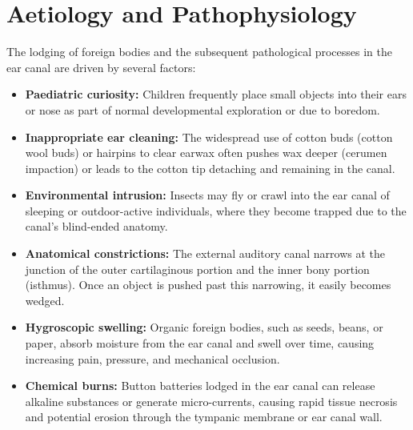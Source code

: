 \section*{Aetiology and Pathophysiology}
The lodging of foreign bodies and the subsequent pathological processes in the ear canal are driven by several factors:
\begin{itemize}
    \item \textbf{Paediatric curiosity:} Children frequently place small objects into their ears or nose as part of normal developmental exploration or due to boredom.
    \item \textbf{Inappropriate ear cleaning:} The widespread use of cotton buds (cotton wool buds) or hairpins to clear earwax often pushes wax deeper (cerumen impaction) or leads to the cotton tip detaching and remaining in the canal.
    \item \textbf{Environmental intrusion:} Insects may fly or crawl into the ear canal of sleeping or outdoor-active individuals, where they become trapped due to the canal's blind-ended anatomy.
    \item \textbf{Anatomical constrictions:} The external auditory canal narrows at the junction of the outer cartilaginous portion and the inner bony portion (isthmus). Once an object is pushed past this narrowing, it easily becomes wedged.
    \item \textbf{Hygroscopic swelling:} Organic foreign bodies, such as seeds, beans, or paper, absorb moisture from the ear canal and swell over time, causing increasing pain, pressure, and mechanical occlusion.
    \item \textbf{Chemical burns:} Button batteries lodged in the ear canal can release alkaline substances or generate micro-currents, causing rapid tissue necrosis and potential erosion through the tympanic membrane or ear canal wall.
\end{itemize}

